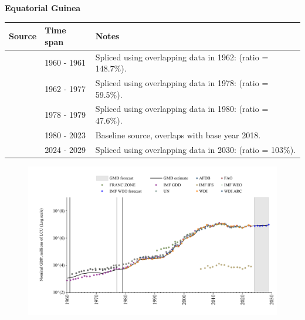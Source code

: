 \documentclass[12pt,a4paper,landscape]{article}
\begin{document}
\begin{adjustbox}{max totalsize={\paperwidth}{\paperheight},center}
\begin{minipage}[t][\textheight][t]{\textwidth}
\vspace*{0.5cm}
{}
\begin{center}
{\Large\bfseries Equatorial Guinea}
\end{center}
\vspace{0.5cm}
\begin{table}[H]
\centering
\small
\begin{tabular}{|l|l|l|}
\hline
\textbf{Source} & \textbf{Time span} & \textbf{Notes} \\
\hline
\rowcolor{white}\cite{IMF_GDD}& 1960 - 1961 &Spliced using overlapping data in 1962: (ratio = 148.7\%).\\
\rowcolor{lightgray}\cite{WDI}& 1962 - 1977 &Spliced using overlapping data in 1978: (ratio = 59.5\%).\\
\rowcolor{white}\cite{UN}& 1978 - 1979 &Spliced using overlapping data in 1980: (ratio = 47.6\%).\\
\rowcolor{lightgray}\cite{WDI}& 1980 - 2023 &Baseline source, overlaps with base year 2018.\\
\rowcolor{white}\cite{IMF_WEO_forecast}& 2024 - 2029 &Spliced using overlapping data in 2030: (ratio = 103\%).\\
\hline
\end{tabular}
\end{table}
\begin{figure}[H]
\centering
\includegraphics[width=\textwidth,height=0.6\textheight,keepaspectratio]{graphs/GNQ_nGDP.pdf}
\end{figure}
\end{minipage}
\end{adjustbox}
\end{document}

